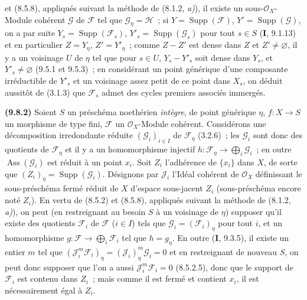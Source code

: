 
et (8.5.8), appliqués suivant la méthode de (8.1.2, \emph{a)}), il existe un
sous-$\mathcal O_X$-Module cohérent $\mathcal G$ de $\mathcal F$ tel que
$\mathcal G_\eta=\mathcal H$~; si $Y=\operatorname{Supp}(\mathcal F)$,
$Y'=\operatorname{Supp}(\mathcal G)$, on a par suite
$Y_s=\operatorname{Supp}(\mathcal F_s)$, $Y'_s=\operatorname{Supp}(\mathcal G_s)$
pour tout $s\in S$ (\textbf{I}, 9.1.13) et en particulier $Z=Y_\eta$,
$Z'=Y'_\eta$~; comme $Z-Z'$ est dense dans $Z$ et $Z'\neq\varnothing$, il y a
un voisinage $U$ de $\eta$ tel que pour $s\in U$, $Y_s-Y'_s$ soit dense dans
$Y_s$, et $Y'_s\neq\varnothing$ (9.5.1 et 9.5.3)~; en considérant un point
générique d'une composante irréductible de $Y'_s$ et un voisinage assez petit de
ce point dans $X_s$, on déduit aussitôt de (3.1.3) que $\mathcal F_s$ admet des
cycles premiers associés immergés.

\label{IV.9.8.2-fr}%
\textbf{(9.8.2)} Soient $S$ un préschéma noethérien \emph{intègre}, de point
générique $\eta$, $f:X\to S$ un morphisme de type fini, $\mathcal F$ un
$\mathcal O_X$-Module cohérent. Considérons une décomposition irredondante
réduite $(\mathcal G_i)_{i\in I}$ de $\mathcal F_\eta$ (3.2.6)~; les
$\mathcal G_i$ sont donc des quotients de $\mathcal F_\eta$ et il y a un
homomorphisme injectif
$h:\mathcal F_\eta\to\bigoplus_i\mathcal G_i$~; en outre
$\operatorname{Ass}(\mathcal G_i)$ est réduit à un point $x_i$. Soit $Z_i$
l'adhérence de $\{x_i\}$ dans $X$, de sorte que
$(Z_i)_\eta=\operatorname{Supp}(\mathcal G_i)$. Désignons par $\mathcal J_i$
l'Idéal cohérent de $\mathcal O_X$ définissant le sous-préschéma fermé réduit de
$X$ d'espace sous-jacent $Z_i$ (sous-préschéma encore noté $Z_i$). En vertu de
(8.5.2) et (8.5.8), appliqués suivant la méthode de (8.1.2, \emph{a)}), on peut
(en restreignant au besoin $S$ à un voisinage de $\eta$) supposer qu'il existe
des quotients $\mathcal F_i$ de $\mathcal F$ ($i\in I$) tels que
$\mathcal G_i=(\mathcal F_i)_\eta$ pour tout $i$, et un homomorphisme
$g:\mathcal F\to\bigoplus_i\mathcal F_i$ tel que $h=g_\eta$. En outre
(\textbf{I}, 9.3.5), il existe un entier $m$ tel que
$(\mathcal J_i^m\mathcal F_i)_\eta=(\mathcal J_i)_\eta^m\mathcal G_i=0$ et en
restreignant de nouveau $S$, on peut donc supposer que l'on a aussi
$\mathcal J_i^m\mathcal F_i=0$ (8.5.2.5), donc que le support de $\mathcal F_i$
est contenu dans $Z_i$~; mais comme il est fermé et contient $x_i$, il est
nécessairement égal à $Z_i$.

